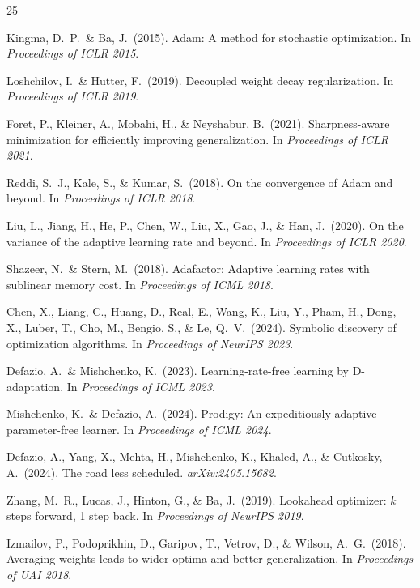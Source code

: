 \documentclass[12pt]{article}
\begin{document}
\begin{thebibliography}{25}

Kingma, D.~P.\ \& Ba, J.\ (2015).
Adam: A method for stochastic optimization.
In \textit{Proceedings of ICLR 2015}.

Loshchilov, I.\ \& Hutter, F.\ (2019).
Decoupled weight decay regularization.
In \textit{Proceedings of ICLR 2019}.

Foret, P., Kleiner, A., Mobahi, H., \& Neyshabur, B.\ (2021).
Sharpness-aware minimization for efficiently improving generalization.
In \textit{Proceedings of ICLR 2021}.

Reddi, S.~J., Kale, S., \& Kumar, S.\ (2018).
On the convergence of Adam and beyond.
In \textit{Proceedings of ICLR 2018}.

Liu, L., Jiang, H., He, P., Chen, W., Liu, X., Gao, J., \& Han, J.\ (2020).
On the variance of the adaptive learning rate and beyond.
In \textit{Proceedings of ICLR 2020}.

Shazeer, N.\ \& Stern, M.\ (2018).
Adafactor: Adaptive learning rates with sublinear memory cost.
In \textit{Proceedings of ICML 2018}.

Chen, X., Liang, C., Huang, D., Real, E., Wang, K., Liu, Y.,
Pham, H., Dong, X., Luber, T., Cho, M., Bengio, S., \& Le, Q.~V.\ (2024).
Symbolic discovery of optimization algorithms.
In \textit{Proceedings of NeurIPS 2023}.

Defazio, A.\ \& Mishchenko, K.\ (2023).
Learning-rate-free learning by D-adaptation.
In \textit{Proceedings of ICML 2023}.

Mishchenko, K.\ \& Defazio, A.\ (2024).
Prodigy: An expeditiously adaptive parameter-free learner.
In \textit{Proceedings of ICML 2024}.

Defazio, A., Yang, X., Mehta, H., Mishchenko, K., Khaled, A.,
\& Cutkosky, A.\ (2024).
The road less scheduled.
\textit{arXiv:2405.15682}.

Zhang, M.~R., Lucas, J., Hinton, G., \& Ba, J.\ (2019).
Lookahead optimizer: $k$ steps forward, 1 step back.
In \textit{Proceedings of NeurIPS 2019}.

Izmailov, P., Podoprikhin, D., Garipov, T., Vetrov, D., \&
Wilson, A.~G.\ (2018).
Averaging weights leads to wider optima and better generalization.
In \textit{Proceedings of UAI 2018}.


\end{thebibliography}
\end{document}
